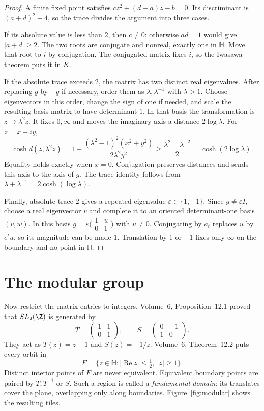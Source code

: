 \begin{proof}
A finite fixed point satisfies $cz^2+(d-a)z-b=0$. Its discriminant is $(a+d)^2-4$, so the trace divides the argument into three cases.

If its absolute value is less than $2$, then $c\ne0$: otherwise $ad=1$ would give $|a+d|\ge2$. The two roots are conjugate and nonreal, exactly one in $\mathbb H$. Move that root to $i$ by conjugation. The conjugated matrix fixes $i$, so the Iwasawa theorem puts it in $K$.

If the absolute trace exceeds $2$, the matrix has two distinct real eigenvalues. After replacing $g$ by $-g$ if necessary, order them as $\lambda,\lambda^{-1}$ with $\lambda>1$. Choose eigenvectors in this order, change the sign of one if needed, and scale the resulting basis matrix to have determinant $1$. In that basis the transformation is $z\mapsto\lambda^2z$. It fixes $0,\infty$ and moves the imaginary axis a distance $2\log\lambda$. For $z=x+iy$,
\[
\cosh d(z,\lambda^2z)
=1+\frac{(\lambda^2-1)^2(x^2+y^2)}{2\lambda^2y^2}
\ge\frac{\lambda^2+\lambda^{-2}}2
=\cosh(2\log\lambda).
\]
Equality holds exactly when $x=0$. Conjugation preserves distances and sends this axis to the axis of $g$. The trace identity follows from $\lambda+\lambda^{-1}=2\cosh(\log\lambda)$.

Finally, absolute trace $2$ gives a repeated eigenvalue $\varepsilon\in\{1,-1\}$. Since $g\ne\varepsilon I$, choose a real eigenvector $v$ and complete it to an oriented determinant-one basis $(v,w)$. In this basis $g=\varepsilon\bigl(\begin{smallmatrix}1&u\\0&1\end{smallmatrix}\bigr)$ with $u\ne0$. Conjugating by $a_t$ replaces $u$ by $e^tu$, so its magnitude can be made $1$. Translation by $1$ or $-1$ fixes only $\infty$ on the boundary and no point in $\mathbb H$.
\end{proof}

\section{The modular group}

Now restrict the matrix entries to integers. Volume~6, Proposition~12.1 proved that $SL_2(\Z)$ is generated by
\[
T=\begin{pmatrix}1&1\\0&1\end{pmatrix},\qquad
S=\begin{pmatrix}0&-1\\1&0\end{pmatrix}.
\]
They act as $T(z)=z+1$ and $S(z)=-1/z$. Volume~6, Theorem~12.2 puts every orbit in
\[
F=\{z\in\mathbb H:|\operatorname{Re}z|\le\tfrac12,\ |z|\ge1\}.
\]
Distinct interior points of $F$ are never equivalent. Equivalent boundary points are paired by $T,T^{-1}$ or $S$. Such a region is called a \emph{fundamental domain}: its translates cover the plane, overlapping only along boundaries. Figure~\ref{fig:modular} shows the resulting tiles.

